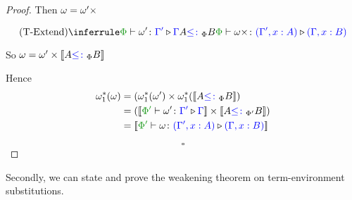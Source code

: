 \documentclass{Report}
\begin{document}
\begin{framed}
\begin{proof}
        \case{\textend}
        Then $\omega = \omega'\times$
        
        \begin{equation}
            \ntreeruleII{\textend}{\ewrel{\P}{\w'}{\G'}{\G}}{A\subtypep B}{\ewrel{\P}{\w\x}{(\G',x:A)}{(\G, x:B)}}
        \end{equation}
        
        So $\omega = \omega'\times{\bf [\![}A{\color{blue} \leq\colon}_\Phi B{\bf ]\!]}$
        
        Hence
        \begin{align*}
            \w_1\star(\w) &=(\w_1\star(\w')\times\w_1\star(\deno{A\subtypep B})\\
            & = (\deno{\ewrel{\P'}{\w'}{\G'}{\G}}\times\deno{A\subtypepp B})\\
            & = \deno{\ewrel{\P'}{\w}{(\G',x:A)}{(\G,x:B)}}
        \end{align*}
    
        $$\square$$
    \end{proof}
\end{framed}


Secondly, we can state and prove the weakening theorem on term-environment substitutions.
\end{document}
